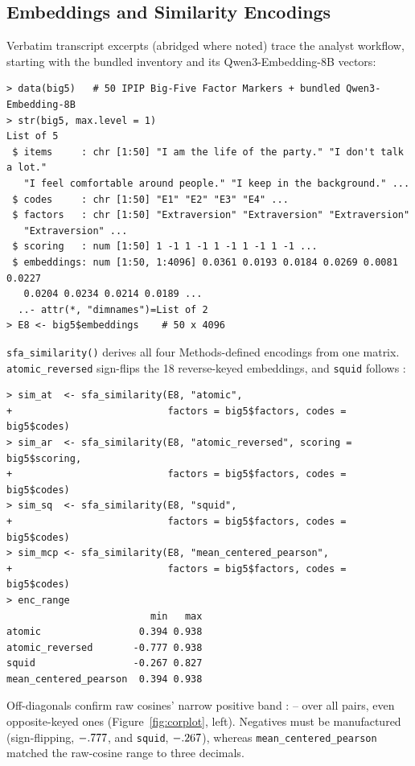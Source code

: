 \subsection{Embeddings and Similarity Encodings}

Verbatim transcript excerpts (abridged where noted) trace the
analyst workflow, starting with the bundled inventory and its
Qwen3-Embedding-8B vectors:

{\scriptsize
\begin{verbatim}
> data(big5)   # 50 IPIP Big-Five Factor Markers + bundled Qwen3-Embedding-8B
> str(big5, max.level = 1)
List of 5
 $ items     : chr [1:50] "I am the life of the party." "I don't talk a lot."
   "I feel comfortable around people." "I keep in the background." ...
 $ codes     : chr [1:50] "E1" "E2" "E3" "E4" ...
 $ factors   : chr [1:50] "Extraversion" "Extraversion" "Extraversion"
   "Extraversion" ...
 $ scoring   : num [1:50] 1 -1 1 -1 1 -1 1 -1 1 -1 ...
 $ embeddings: num [1:50, 1:4096] 0.0361 0.0193 0.0184 0.0269 0.0081 0.0227
   0.0204 0.0234 0.0214 0.0189 ...
  ..- attr(*, "dimnames")=List of 2
> E8 <- big5$embeddings    # 50 x 4096
\end{verbatim}
}

\texttt{sfa\_similarity()} derives all four Methods-defined encodings
from one matrix. \texttt{atomic\_reversed} sign-flips the 18
reverse-keyed embeddings, and \texttt{squid} follows
\citet{pellert-etal-2026}:

{\scriptsize
\begin{verbatim}
> sim_at  <- sfa_similarity(E8, "atomic",
+                           factors = big5$factors, codes = big5$codes)
> sim_ar  <- sfa_similarity(E8, "atomic_reversed", scoring = big5$scoring,
+                           factors = big5$factors, codes = big5$codes)
> sim_sq  <- sfa_similarity(E8, "squid",
+                           factors = big5$factors, codes = big5$codes)
> sim_mcp <- sfa_similarity(E8, "mean_centered_pearson",
+                           factors = big5$factors, codes = big5$codes)
> enc_range
                         min   max
atomic                 0.394 0.938
atomic_reversed       -0.777 0.938
squid                 -0.267 0.827
mean_centered_pearson  0.394 0.938
\end{verbatim}
}

Off-diagonals confirm raw cosines' narrow positive band
\citep{hommel-arslan-2025, pellert-etal-2026}: \valRangeCosMin--\valRangeCosMax{} over all
\valNPairs{} pairs, even opposite-keyed ones (Figure~\ref{fig:corplot},
left). Negatives must be manufactured (sign-flipping, $-.777$,
and \texttt{squid}, $-.267$), whereas \texttt{mean\_centered\_pearson}
matched the raw-cosine range to three decimals.

